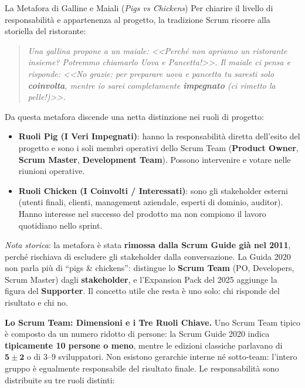 \documentclass[12pt]{extarticle}
\begin{document}
\begin{cbox}{La Metafora di Galline e Maiali (\textit{Pigs vs Chickens})}
\noindent Per chiarire il livello di responsabilità e appartenenza al progetto, la tradizione Scrum ricorre alla storiella del ristorante:
\begin{quote}
    \textit{Una gallina propone a un maiale: <<Perché non apriamo un ristorante insieme? Potremmo chiamarlo Uova e Pancetta!>>. Il maiale ci pensa e risponde: <<No grazie: per preparare uova e pancetta tu saresti solo \textbf{coinvolta}, mentre io sarei completamente \textbf{impegnato} (ci rimetto la pelle!)>>.}
\end{quote}
\medskip
\noindent Da questa metafora discende una netta distinzione nei ruoli di progetto:
\begin{itemize}
    \item \textbf{Ruoli Pig (I Veri Impegnati)}: hanno la responsabilità diretta dell'esito del progetto e sono i soli membri operativi dello Scrum Team (\textbf{Product Owner}, \textbf{Scrum Master}, \textbf{Development Team}). Possono intervenire e votare nelle riunioni operative.
    \item \textbf{Ruoli Chicken (I Coinvolti / Interessati)}: sono gli stakeholder esterni (utenti finali, clienti, management aziendale, esperti di dominio, auditor). Hanno interesse nel successo del prodotto ma non compiono il lavoro quotidiano nello sprint.
\end{itemize}
\medskip
\noindent \textit{Nota storica}: la metafora è stata \textbf{rimossa dalla Scrum Guide già nel 2011}, perché rischiava di escludere gli stakeholder dalla conversazione. La Guida 2020 non parla più di ``pigs \& chickens'': distingue lo \textbf{Scrum Team} (PO, Developers, Scrum Master) dagli \textbf{stakeholder}, e l'Expansion Pack del 2025 aggiunge la figura del \textbf{Supporter}. Il concetto utile che resta è uno solo: chi risponde del risultato e chi no.
\end{cbox}

\medskip
\noindent \textbf{Lo Scrum Team: Dimensioni e i Tre Ruoli Chiave.} Uno Scrum Team tipico è composto da un numero ridotto di persone: la Scrum Guide 2020 indica \textbf{tipicamente 10 persone o meno}, mentre le edizioni classiche parlavano di $\mathbf{5 \pm 2}$ o di 3--9 sviluppatori. Non esistono gerarchie interne né sotto-team: l'intero gruppo è egualmente responsabile del risultato finale. Le responsabilità sono distribuite su tre ruoli distinti:
\end{document}
